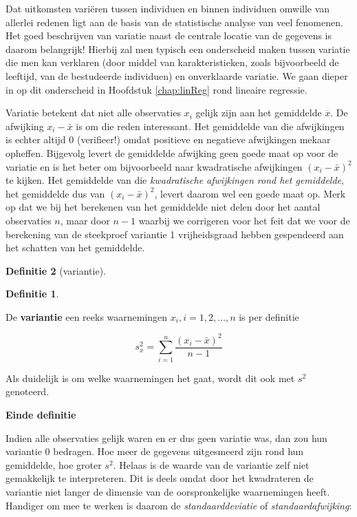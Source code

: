 \documentclass[
  12pt,dutch,coursenotes]{book}
\theoremstyle{definition}
\newtheorem{definition}{Definitie}[chapter]
\theoremstyle{definition}
\theoremstyle{definition}
\theoremstyle{remark}
\begin{document}
Dat uitkomsten variëren tussen individuen en binnen individuen omwille van
allerlei redenen ligt aan de basis van de statistische analyse van veel
fenomenen. Het goed beschrijven van variatie naast de centrale locatie van
de gegevens is daarom belangrijk! Hierbij zal men typisch een
onderscheid maken tussen variatie die men kan verklaren (door middel van
karakteristieken, zoals bijvoorbeeld de leeftijd, van de bestudeerde individuen) en onverklaarde variatie. We gaan
dieper in op dit onderscheid in Hoofdstuk \ref{chap:linReg} rond lineaire regressie.

Variatie betekent dat niet alle observaties \(x_i\) gelijk zijn aan het
gemiddelde \(\overline{x}\). De afwijking \(x_i - \bar{x}\) is om die reden
interessant. Het gemiddelde van die afwijkingen is echter altijd 0
(verifieer!) omdat positieve en negatieve afwijkingen mekaar opheffen.
Bijgevolg levert de gemiddelde afwijking geen goede maat op voor de variatie
en is het beter om bijvoorbeeld naar kwadratische afwijkingen \((x_i - \bar{x})^2\) te kijken. Het gemiddelde van die \emph{kwadratische afwijkingen rond het gemiddelde}, het gemiddelde dus van \((x_i - \bar{x})^2\), levert daarom
wel een goede maat op. Merk op dat we bij het berekenen van het gemiddelde niet delen door het aantal observaties \(n\), maar door \(n-1\) waarbij we corrigeren voor het feit dat we voor de berekening van de steekproef variantie 1 vrijheidsgraad hebben gespendeerd aan het schatten van het gemiddelde.

\begin{definition}[variantie]
\begin{definition}

\protect\hypertarget{def:unnamed-chunk-101}{}{\label{def:unnamed-chunk-101} \iffalse (variantie) \fi{} }

\end{definition}
\end{definition}

De \textbf{variantie} een reeks waarnemingen \(x_i, i=1, 2, \dots, n\) is per
definitie

\begin{equation*}
s^2_x = \sum_{i=1}^{n} \frac{(x_i - \bar{x})^2}{n-1}
\end{equation*}

Als duidelijk is om welke waarnemingen het gaat, wordt dit ook met \(s^2\)
genoteerd.

\textbf{Einde definitie}

Indien alle observaties gelijk waren en er dus geen variatie was, dan zou
hun variantie 0 bedragen. Hoe meer de gegevens uitgesmeerd zijn rond hun
gemiddelde, hoe groter \(s^2\). Helaas is de waarde van de variantie zelf niet
gemakkelijk te interpreteren. Dit is deels omdat door het kwadrateren de
variantie niet langer de dimensie van de oorspronkelijke waarnemingen heeft.
Handiger om mee te werken is daarom de \emph{standaarddeviatie} of \emph{
standaardafwijking}:
\end{document}
